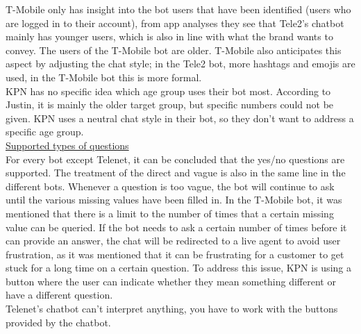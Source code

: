 \break
T-Mobile only has insight into the bot users that have been identified (users who are logged in to their account), from app analyses they see that Tele2's chatbot mainly has younger users, which is also in line with what the brand wants to convey. The users of the T-Mobile bot are older. T-Mobile also anticipates this aspect by adjusting the chat style; in the Tele2 bot, more hashtags and emojis are used, in the T-Mobile bot this is more formal.\\
\break
KPN has no specific idea which age group uses their bot most. According to Justin, it is mainly the older target group, but specific numbers could not be given. KPN uses a neutral chat style in their bot, so they don't want to address a specific age group.\\
\break
\ul{Supported types of questions}\\
For every bot except Telenet, it can be concluded that the yes/no questions are supported. The treatment of the direct and vague is also in the same line in the different bots. Whenever a question is too vague, the bot will continue to ask until the various missing values have been filled in. In the T-Mobile bot, it was mentioned that there is a limit to the number of times that a certain missing value can be queried. If the bot needs to ask a certain number of times before it can provide an answer, the chat will be redirected to a live agent to avoid user frustration, as it was mentioned that it can be frustrating for a customer to get stuck for a long time on a certain question. To address this issue, KPN is using a button where the user can indicate whether they mean something different or have a different question.\\
Telenet's chatbot can't interpret anything, you have to work with the buttons provided by the chatbot.\\
\break

